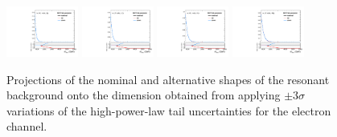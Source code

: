 \begin{figure}[htbp]
  \centering
  \includegraphics[width=0.21\textwidth]{fig/analysisAppendix/systs_res_e_HP_nobb_LDy_MVVTail_ProjX.pdf}
  \includegraphics[width=0.21\textwidth]{fig/analysisAppendix/systs_res_e_LP_nobb_LDy_MVVTail_ProjX.pdf}
  \includegraphics[width=0.21\textwidth]{fig/analysisAppendix/systs_res_e_HP_nobb_HDy_MVVTail_ProjX.pdf}
  \includegraphics[width=0.21\textwidth]{fig/analysisAppendix/systs_res_e_LP_nobb_HDy_MVVTail_ProjX.pdf}\\
  \caption{
    Projections of the nominal and alternative shapes of the resonant background onto the \MVV dimension obtained from applying $\pm3\sigma$ variations of the high-\MVV power-law tail uncertainties for the electron channel.
  }
  \label{fig:systResMVV_MVVTail}
\end{figure}

